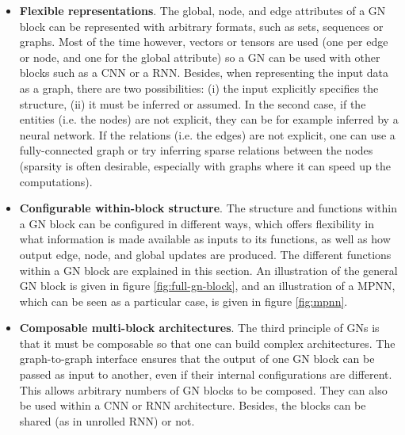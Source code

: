 \documentclass{article}
\begin{document}
\begin{itemize}
    \item \textbf{Flexible representations}. The global, node, and edge attributes of a GN block can be represented with arbitrary formats, such as sets, sequences or graphs. Most of the time however, vectors or tensors are used (one per edge or node, and one for the global attribute) so a GN can be used with other blocks such as a CNN or a RNN. Besides, when representing the input data as a graph, there are two possibilities: (i) the input explicitly specifies the structure, (ii) it must be inferred or assumed. In the second case, if the entities (i.e. the nodes) are not explicit, they can be for example inferred by a neural network. If the relations (i.e. the edges) are not explicit, one can use a fully-connected graph or try inferring sparse relations between the nodes (sparsity is often desirable, especially with graphs where it can speed up the computations).
    
    \item \textbf{Configurable within-block structure}. The structure and functions within a GN block can be configured in different ways, which offers flexibility in what information is made available as inputs to its functions, as well as how output edge, node, and global updates are produced. The different functions within a GN block are explained in this section. An illustration of the general GN block is given in figure \ref{fig:full-gn-block}, and an illustration of a MPNN, which can be seen as a particular case, is given in figure \ref{fig:mpnn}.
    
    \item \textbf{Composable multi-block architectures}. The third principle of GNs is that it must be composable so that one can build complex architectures. The graph-to-graph interface ensures that the output of one GN block can be passed as input to another, even if their internal configurations are different. This allows arbitrary numbers of GN blocks to be composed. They can also be used within a CNN or RNN architecture. Besides, the blocks can be shared (as in unrolled RNN) or not. 
\end{itemize}
\end{document}
